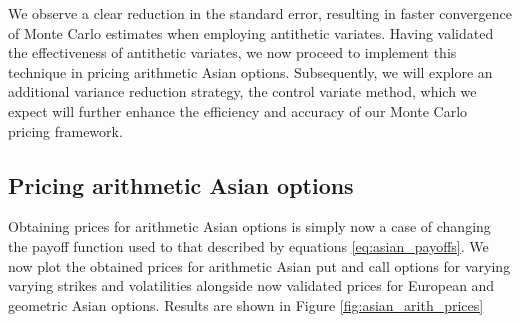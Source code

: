 We observe a clear reduction in the standard error, 
resulting in faster convergence of Monte Carlo estimates when employing antithetic variates. 
Having validated the effectiveness of antithetic variates, we now proceed to implement this technique 
in pricing arithmetic Asian options. Subsequently, we will explore an additional variance reduction 
strategy, the control variate method, which we expect will further enhance the efficiency and accuracy 
of our Monte Carlo pricing framework.

\subsection{Pricing arithmetic Asian options}

Obtaining prices for arithmetic Asian options is simply now a case of changing the payoff function 
used to that described by equations \eqref{eq:asian_payoffs}. We now plot the obtained prices for 
arithmetic Asian put and call options for varying varying strikes and volatilities alongside now
validated prices for European and geometric Asian options. Results are shown in Figure 
\ref{fig:asian_arith_prices}


